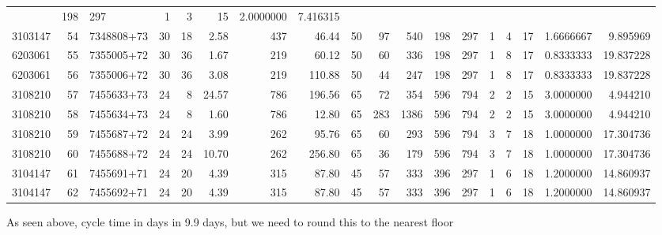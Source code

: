 \documentclass[
]{article}
\newenvironment{Shaded}{\begin{snugshade}}{\end{snugshade}}
\newcommand{\CommentTok}[1]{\textcolor[rgb]{0.56,0.35,0.01}{\textit{#1}}}
\newcommand{\DataTypeTok}[1]{\textcolor[rgb]{0.13,0.29,0.53}{#1}}
\newcommand{\DecValTok}[1]{\textcolor[rgb]{0.00,0.00,0.81}{#1}}
\newcommand{\KeywordTok}[1]{\textcolor[rgb]{0.13,0.29,0.53}{\textbf{#1}}}
\newcommand{\NormalTok}[1]{#1}
\newcommand{\OperatorTok}[1]{\textcolor[rgb]{0.81,0.36,0.00}{\textbf{#1}}}
\newcommand{\StringTok}[1]{\textcolor[rgb]{0.31,0.60,0.02}{#1}}
\begin{document}
\begin{longtable}[]{@{}rrlrrrrrrrrrrrrrrr@{}}
& 198 & 297 & 1 & 3 & 15 & 2.0000000 & 7.416315\tabularnewline
3103147 & 54 & 7348808+73 & 30 & 18 & 2.58 & 437 & 46.44 & 50 & 97 & 540
& 198 & 297 & 1 & 4 & 17 & 1.6666667 & 9.895969\tabularnewline
6203061 & 55 & 7355005+72 & 30 & 36 & 1.67 & 219 & 60.12 & 50 & 60 & 336
& 198 & 297 & 1 & 8 & 17 & 0.8333333 & 19.837228\tabularnewline
6203061 & 56 & 7355006+72 & 30 & 36 & 3.08 & 219 & 110.88 & 50 & 44 &
247 & 198 & 297 & 1 & 8 & 17 & 0.8333333 & 19.837228\tabularnewline
3108210 & 57 & 7455633+73 & 24 & 8 & 24.57 & 786 & 196.56 & 65 & 72 &
354 & 596 & 794 & 2 & 2 & 15 & 3.0000000 & 4.944210\tabularnewline
3108210 & 58 & 7455634+73 & 24 & 8 & 1.60 & 786 & 12.80 & 65 & 283 &
1386 & 596 & 794 & 2 & 2 & 15 & 3.0000000 & 4.944210\tabularnewline
3108210 & 59 & 7455687+72 & 24 & 24 & 3.99 & 262 & 95.76 & 65 & 60 & 293
& 596 & 794 & 3 & 7 & 18 & 1.0000000 & 17.304736\tabularnewline
3108210 & 60 & 7455688+72 & 24 & 24 & 10.70 & 262 & 256.80 & 65 & 36 &
179 & 596 & 794 & 3 & 7 & 18 & 1.0000000 & 17.304736\tabularnewline
3104147 & 61 & 7455691+71 & 24 & 20 & 4.39 & 315 & 87.80 & 45 & 57 & 333
& 396 & 297 & 1 & 6 & 18 & 1.2000000 & 14.860937\tabularnewline
3104147 & 62 & 7455692+71 & 24 & 20 & 4.39 & 315 & 87.80 & 45 & 57 & 333
& 396 & 297 & 1 & 6 & 18 & 1.2000000 & 14.860937\tabularnewline
\bottomrule
\end{longtable}

As seen above, cycle time in days in 9.9 days, but we need to round this
to the nearest floor

\begin{Shaded}
\end{Shaded}
\end{document}

